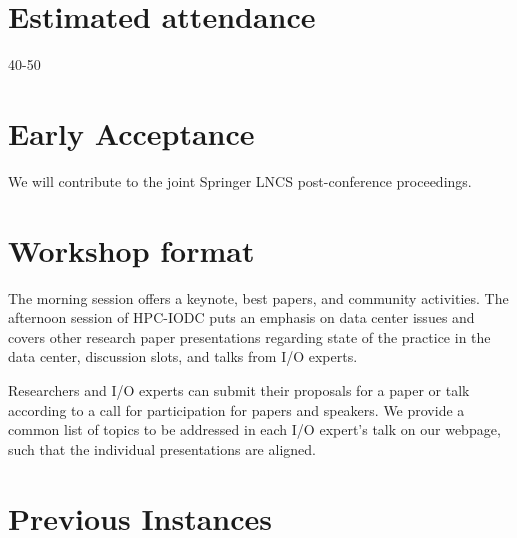 \documentclass[a4paper,10pt]{article}
\begin{document}
\section{Estimated attendance}
40-50

\section{Early Acceptance}

We will contribute to the joint Springer LNCS post-conference proceedings.


\section{Workshop format}
The morning session offers a keynote, best papers, and community activities.
The afternoon session of HPC-IODC puts an emphasis on data center issues and covers other research paper presentations regarding state of the practice in the data center, discussion slots, and talks from I/O experts.

Researchers and I/O experts can submit their proposals for a paper or talk according to a call for participation for papers and speakers.
We provide a common list of topics to be addressed in each I/O expert's talk on our webpage, such that the individual presentations are aligned.



\section{Previous Instances}
\end{document}
